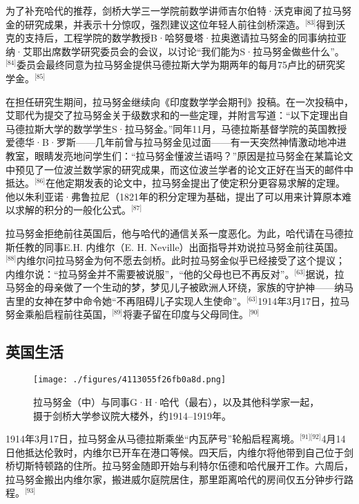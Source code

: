 为了补充哈代的推荐，剑桥大学三一学院前数学讲师吉尔伯特·沃克审阅了拉马努金的研究成果，并表示十分惊叹，强烈建议这位年轻人前往剑桥深造。\(^\text{[83]}\)得到沃克的支持后，工程学院的数学教授B·哈努曼塔·拉奥邀请拉马努金的同事纳拉亚纳·艾耶出席数学研究委员会的会议，以讨论“我们能为S·拉马努金做些什么”。\(^\text{[84]}\)委员会最终同意为拉马努金提供马德拉斯大学为期两年的每月75卢比的研究奖学金。\(^\text{[85]}\)

在担任研究生期间，拉马努金继续向《印度数学学会期刊》投稿。在一次投稿中，艾耶代为提交了拉马努金关于级数求和的一些定理，并附言写道：“以下定理出自马德拉斯大学的数学学生S·拉马努金。”同年11月，马德拉斯基督学院的英国教授爱德华·B·罗斯——几年前曾与拉马努金见过面——有一天突然神情激动地冲进教室，眼睛发亮地问学生们：“拉马努金懂波兰语吗？”原因是拉马努金在某篇论文中预见了一位波兰数学家的研究成果，而这位波兰学者的论文正好在当天的邮件中抵达。\(^\text{[86]}\)在他定期发表的论文中，拉马努金提出了使定积分更容易求解的定理。他以朱利亚诺·弗鲁拉尼（1821年的积分定理为基础，提出了可以用来计算原本难以求解的积分的一般化公式。\(^\text{[87]}\)

拉马努金拒绝前往英国后，他与哈代的通信关系一度恶化。为此，哈代请在马德拉斯任教的同事E.H. 内维尔（E. H. Neville）出面指导并劝说拉马努金前往英国。\(^\text{[88]}\)内维尔问拉马努金为何不愿去剑桥。此时拉马努金似乎已经接受了这个提议；内维尔说：“拉马努金并不需要被说服”，“他的父母也已不再反对”。\(^\text{[63]}\)据说，拉马努金的母亲做了一个生动的梦，梦见儿子被欧洲人环绕，家族的守护神——纳马吉里的女神在梦中命令她“不再阻碍儿子实现人生使命”。\(^\text{[63]}\)1914年3月17日，拉马努金乘船启程前往英国，\(^\text{[89]}\)将妻子留在印度与父母同住。\(^\text{[90]}\)
\subsection{英国生活}
\begin{figure}[ht]
\centering
\texttt{[image: ./figures/4113055f26fb0a8d.png]}
\caption{拉马努金（中）与同事G·H·哈代（最右），以及其他科学家一起，摄于剑桥大学参议院大楼外，约1914–1919年。} \label{fig_LMLJ_5}
\end{figure}
1914年3月17日，拉马努金从马德拉斯乘坐“内瓦萨号”轮船启程离境。\(^\text{[91][92]}\)4月14日他抵达伦敦时，内维尔已开车在港口等候。四天后，内维尔将他带到自己位于剑桥切斯特顿路的住所。拉马努金随即开始与利特尔伍德和哈代展开工作。六周后，拉马努金搬出内维尔家，搬进威尔庭院居住，那里距离哈代的房间仅五分钟步行路程。\(^\text{[93]}\)

